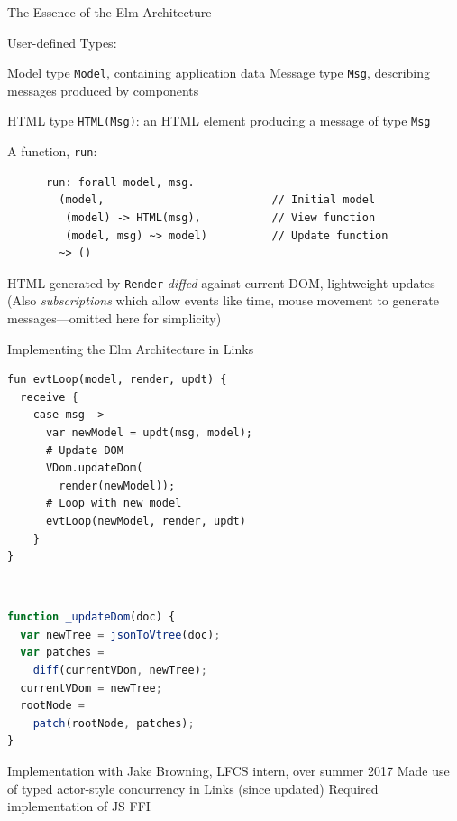 \documentclass[11.5pt, aspectratio=169]{beamer}
\begin{document}
\begin{frame}[fragile]{The Essence of the Elm Architecture}

  \begin{fullpageitemize}
   User-defined Types:
    \begin{itemize}
      \itemR Model type \verb+Model+, containing application data
      \itemR Message type \verb+Msg+, describing messages produced by components
    \end{itemize}
    \vspace{0em}

   HTML type \verb+HTML(Msg)+: an HTML element producing a message of
    type \verb+Msg+

   A function, \verb+run+:
    \begin{verbatim}
      run: forall model, msg.
        (model,                          // Initial model
         (model) -> HTML(msg),           // View function
         (model, msg) ~> model)          // Update function
        ~> ()
    \end{verbatim}

    \vspace{0em}

   HTML generated by \verb+Render+ \emph{diffed} against current DOM, lightweight updates
   (Also \emph{subscriptions} which allow events like time, mouse movement
    to generate messages---omitted here for simplicity)
  \end{fullpageitemize}
\end{frame}

\begin{frame}[fragile]{Implementing the Elm Architecture in Links}

  \begin{minipage}{0.475\textwidth}
  \begin{lstlisting}[language=links]
fun evtLoop(model, render, updt) {
  receive {
    case msg ->
      var newModel = updt(msg, model);
      # Update DOM
      VDom.updateDom(
        render(newModel));
      # Loop with new model
      evtLoop(newModel, render, updt)
    }
}
\end{lstlisting}
\end{minipage}
~\hfill
\begin{minipage}{0.5\textwidth}
\begin{lstlisting}[language=JavaScript]
function _updateDom(doc) {
  var newTree = jsonToVtree(doc);
  var patches =
    diff(currentVDom, newTree);
  currentVDom = newTree;
  rootNode =
    patch(rootNode, patches);
}
\end{lstlisting}
\end{minipage}

  \begin{fullpageitemize}
  \itemR Implementation with Jake Browning, LFCS intern, over summer 2017
  \itemR Made use of typed actor-style concurrency in Links (since updated)
  \itemR Required implementation of JS FFI
  \end{fullpageitemize}
\end{frame}
\end{document}
